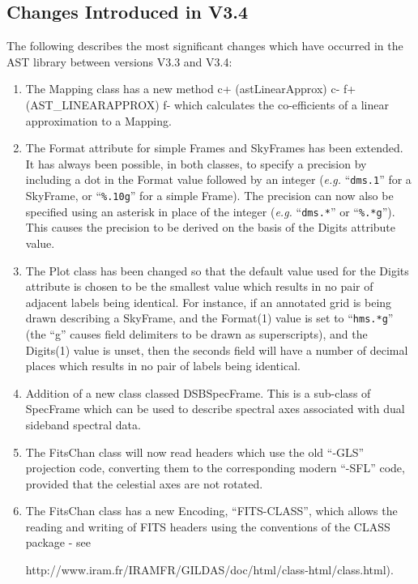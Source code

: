 \documentclass[twoside,11pt]{article}
\newcommand{\htmladdnormallink}[2]{#1}
\begin{document}
\subsection{Changes Introduced in V3.4}

The following describes the most significant changes which have
occurred in the AST library between versions V3.3 and V3.4:

\begin{enumerate}

\item The Mapping class has a new method
c+
(astLinearApprox)
c-
f+
(AST\_LINEARAPPROX)
f-
which calculates the co-efficients of a linear approximation to a Mapping.

\item The Format attribute for simple Frames and SkyFrames has been extended.
It has always been possible, in both classes, to specify a precision by
including a dot in the Format value followed by an integer (\emph{e.g.}
``\verb+dms.1+'' for a SkyFrame, or ``\verb+%.10g+'' for a simple Frame).
The precision can now also be specified using an asterisk in place of the
integer (\emph{e.g.} ``\verb+dms.*+'' or ``\verb+%.*g+''). This causes the
precision to be derived on the basis of the Digits attribute value.

\item The Plot class has been changed so that the default value used for the
Digits attribute is chosen to be the smallest value which results in no
pair of adjacent labels being identical. For instance, if an annotated
grid is being drawn describing a SkyFrame, and the Format(1) value is set
to ``\verb+hms.*g+'' (the ``g'' causes field delimiters to be drawn as
superscripts), and the Digits(1) value is unset, then the seconds field
will have a number of decimal places which results in no pair of labels
being identical.

\item Addition of a new class classed DSBSpecFrame. This is a
sub-class of SpecFrame which can be used to describe spectral axes
associated with dual sideband spectral data.

\item The FitsChan class will now read headers which use the old ``-GLS''
projection code, converting them to the corresponding modern ``-SFL'' code,
provided that the celestial axes are not rotated.

\item The FitsChan class has a new Encoding, ``FITS-CLASS'', which allows
the reading and writing of FITS headers using the conventions of the CLASS
package - see
\htmladdnormallink{
http://www.iram.fr/IRAMFR/GILDAS/doc/html/class-html/class.html}{
http://www.iram.fr/IRAMFR/GILDAS/doc/html/class-html/class.html}).

\end{enumerate}
\end{document}
